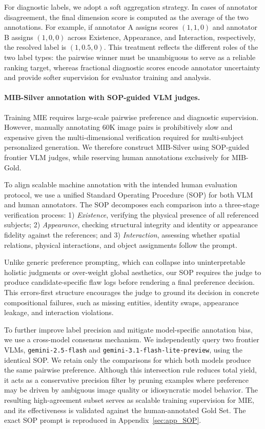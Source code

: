 For diagnostic labels, we adopt a soft aggregation strategy. In cases of annotator disagreement, the final dimension score is computed as the average of the two annotations. For example, if annotator A assigns scores $(1, 1, 0)$ and annotator B assigns $(1, 0, 0)$ across Existence, Appearance, and Interaction, respectively, the resolved label is $(1, 0.5, 0)$. This treatment reflects the different roles of the two label types: the pairwise winner must be unambiguous to serve as a reliable ranking target, whereas fractional diagnostic scores encode annotator uncertainty and provide softer supervision for evaluator training and analysis.

\paragraph{MIB-Silver annotation with SOP-guided VLM judges.}
Training MIE requires large-scale pairwise preference and diagnostic supervision. However, manually annotating 60K image pairs is prohibitively slow and expensive given the multi-dimensional verification required for multi-subject personalized generation. We therefore construct MIB-Silver using SOP-guided frontier VLM judges, while reserving human annotations exclusively for MIB-Gold.

To align scalable machine annotation with the intended human evaluation protocol, we use a unified Standard Operating Procedure (SOP) for both VLM and human annotators. The SOP decomposes each comparison into a three-stage verification process: 1) \emph{Existence}, verifying the physical presence of all referenced subjects; 2) \emph{Appearance}, checking structural integrity and identity or appearance fidelity against the references; and 3) \emph{Interaction}, assessing whether spatial relations, physical interactions, and object assignments follow the prompt.

Unlike generic preference prompting, which can collapse into uninterpretable holistic judgments or over-weight global aesthetics, our SOP requires the judge to produce candidate-specific flaw logs before rendering a final preference decision. This errors-first structure encourages the judge to ground its decision in concrete compositional failures, such as missing entities, identity swaps, appearance leakage, and interaction violations.

To further improve label precision and mitigate model-specific annotation bias, we use a cross-model consensus mechanism. We independently query two frontier VLMs, \texttt{gemini-2.5-flash} and \texttt{gemini-3.1-flash-lite-preview}, using the identical SOP. We retain only the comparisons for which both models produce the same pairwise preference. Although this intersection rule reduces total yield, it acts as a conservative precision filter by pruning examples where preference may be driven by ambiguous image quality or idiosyncratic model behavior. The resulting high-agreement subset serves as scalable training supervision for MIE, and its effectiveness is validated against the human-annotated Gold Set. The exact SOP prompt is reproduced in Appendix~\ref{sec:app_SOP}.

